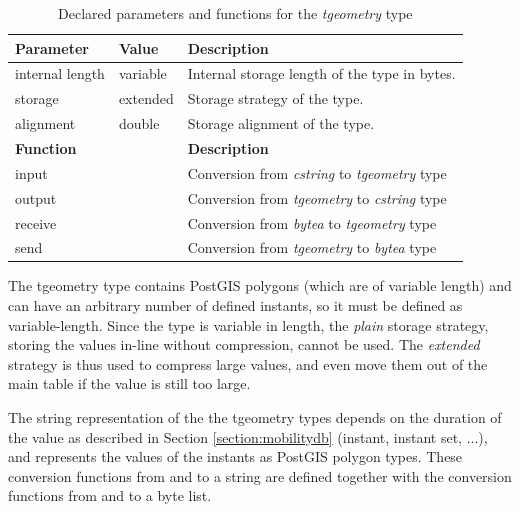 \begin{table}[h!]
    \centering
    \begin{tabularx}{\textwidth}{|l|l|X|}
    \hline
    \textbf{Parameter}  & \textbf{Value}        & \textbf{Description} \\ 
    \hline
    internal length     & variable              & Internal storage length of the type in bytes. \\
    \hline
    storage             & extended              & Storage strategy of the type. \\
    \hline
    alignment           & double                & Storage alignment of the type. \\
    \hline
    \multicolumn{2}{|l|}{\textbf{Function}}     & \textbf{Description} \\ 
    \hline
    \multicolumn{2}{|l|}{input}                 & Conversion from \textit{cstring} to \textit{tgeometry} type \\
    \hline
    \multicolumn{2}{|l|}{output}                & Conversion from \textit{tgeometry} to \textit{cstring} type \\
    \hline
    \multicolumn{2}{|l|}{receive}               & Conversion from \textit{bytea} to \textit{tgeometry} type \\
    \hline
    \multicolumn{2}{|l|}{send}                  & Conversion from \textit{tgeometry} to \textit{bytea} type \\
    \hline
    \end{tabularx}
    \caption{Declared parameters and functions for the \textit{tgeometry} type}
    \label{table:tgeometry_type_declaration}
\end{table}

The tgeometry type contains PostGIS polygons (which are of variable length) and can have an arbitrary number of defined instants, so it must be defined as variable-length. Since the type is variable in length, the \textit{plain} storage strategy, storing the values in-line without compression, cannot be used. The \textit{extended} strategy is thus used to compress large values, and even move them out of the main table if the value is still too large.

The string representation of the the tgeometry types depends on the duration of the value as described in Section \ref{section:mobilitydb} (instant, instant set, ...), and represents the values of the instants as PostGIS polygon types. These conversion functions from and to a string are defined together with the conversion functions from and to a byte list.

